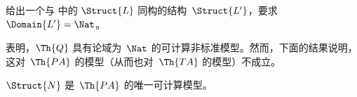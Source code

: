 \documentclass[../../../include/open-logic-section]{subfiles}
\begin{document}
\begin{prob}
给出一个与  中的 $\Struct{L}$ 同构的结构~$\Struct{L'}$，要求 $\Domain{L'} = \Nat$。
\end{prob}

\begin{explain}
 表明，$\Th{Q}$ 具有论域为~$\Nat$ 的可计算非标准模型。然而，下面的结果说明，这对~$\Th{PA}$ 的模型（从而也对~$\Th{TA}$ 的模型）不成立。
\end{explain}

\begin{thm}[Tennenbaum定理]
$\Struct{N}$ 是~$\Th{PA}$ 的唯一可计算模型。
\end{thm}
\end{document}

